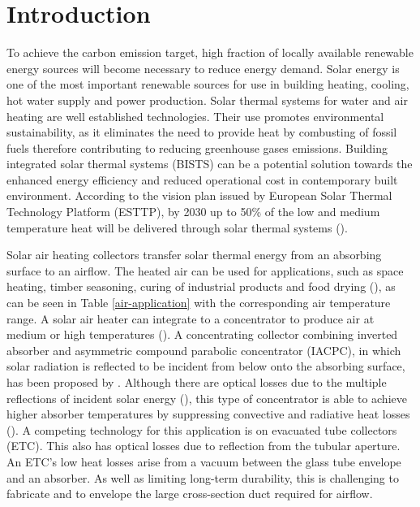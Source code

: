 \chapter{Introduction}
\label{Cap:Int}

To achieve the carbon emission target, high fraction of locally available renewable energy sources will become necessary to reduce energy demand. Solar energy is one of the most important renewable sources for use in building heating, cooling, hot water supply and power production. Solar thermal systems for water and air heating are well established technologies. Their use promotes environmental sustainability, as it eliminates the need to provide heat by combusting of fossil fuels therefore contributing to reducing greenhouse gases emissions. Building integrated solar thermal systems (BISTS) can be a potential solution towards the enhanced energy efficiency and reduced operational cost in contemporary built environment. According to the vision plan issued by European Solar Thermal Technology Platform (ESTTP), by 2030 up to 50\% of the low and medium temperature heat will be delivered through solar thermal systems (\cite{ESTTP2009}).

Solar air heating collectors transfer solar thermal energy from an absorbing surface to an airflow. The heated air can be used for applications, such as space heating, timber seasoning, curing of industrial products and food drying (\cite{Shams2016}), as can be seen in Table \ref{air-application} with the corresponding air temperature range. A solar air heater can integrate to a concentrator to produce air at medium or high temperatures (\cite{Duffie2013}). A concentrating collector combining inverted absorber and asymmetric compound parabolic concentrator (IACPC), in which solar radiation is reflected to be incident from below onto the absorbing surface, has been proposed by \citet{Rabl1976}. Although there are optical losses due to the multiple reflections of incident solar energy (\cite{Kothdiwala1996}), this type of concentrator is able to achieve higher absorber temperatures by suppressing convective and radiative heat losses (\cite{Kothdiwala1999}). A competing technology for this application is on evacuated tube collectors (ETC). This also has optical losses due to reflection from the tubular aperture. An ETC's low heat losses arise from a vacuum between the glass tube envelope and an absorber. As well as limiting long-term durability, this is challenging to fabricate and to envelope the large cross-section duct required for airflow. 

